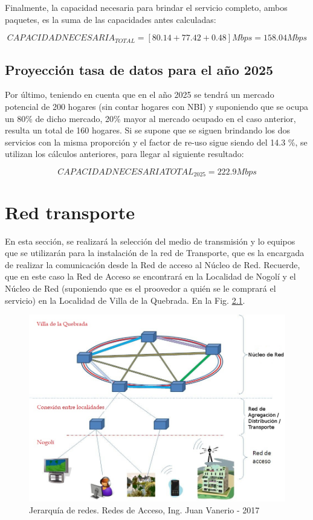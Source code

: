 \documentclass[12pt,a4paper]{book}
\begin{document}
Finalmente, la capacidad necesaria para brindar el servicio completo, ambos paquetes, es la suma de las capacidades antes calculadas:

\begin{equation}
CAPACIDAD NECESARIA _{TOTAL} = [80.14 + 77.42 + 0.48] Mbps  = 158.04 Mbps
\end{equation}

\section{Proyección tasa de datos para el año 2025}

Por último, teniendo en cuenta que en el año 2025 se tendrá un mercado potencial de 200 hogares (sin contar hogares con NBI) y suponiendo que se ocupa un 80\% de dicho mercado, 20\% mayor al mercado ocupado en el caso anterior, resulta un total de 160 hogares. Si se supone que se siguen brindando los dos servicios con la misma proporción y el factor de re-uso sigue siendo del 14.3 \%, se utilizan los cálculos anteriores, para llegar al siguiente resultado:

\begin{equation}
CAPACIDAD NECESARIA TOTAL _{2025} =  222.9 Mbps
\end{equation}



\chapter{Red transporte}

En esta sección, se realizará la selección del medio de transmisión y lo equipos que se utilizarán para la instalación de la red de Transporte, que es la encargada de realizar la comunicación desde la Red de acceso al Núcleo de Red. Recuerde, que en este caso la Red de Acceso se encontrará en la Localidad de Nogolí y el Núcleo de Red (suponiendo que es el proovedor a quién se le comprará el servicio) en la Localidad de Villa de la Quebrada. En la Fig. \ref{fig_jerarquia_redes}.

\begin{figure} [H]
\centering
\includegraphics[width= 12 cm]{../figuras/red_transporte_1.jpg}
\caption{Jerarquía de redes. Redes de Acceso, Ing. Juan Vanerio - 2017}
\label{fig_jerarquia_redes}
\end{figure}
\end{document}
